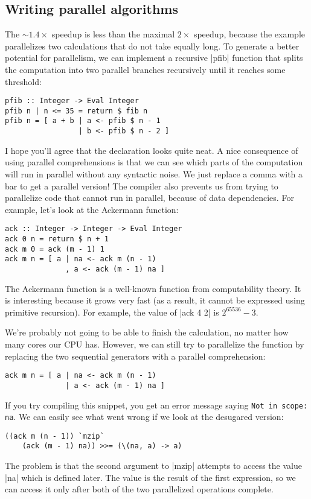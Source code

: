 \documentclass{tmr}
\begin{document}
\subsection{Writing parallel algorithms}
The $\mathord{\sim} 1.4\times$ speedup is less than the maximal $2\times$ speedup, because the example parallelizes two 
calculations that do not take equally long. To generate a better potential for parallelism,
we can implement a recursive |pfib| function that splits the computation into two parallel branches 
recursively until it reaches some threshold:

\begin{verbatim}
pfib :: Integer -> Eval Integer
pfib n | n <= 35 = return $ fib n
pfib n = [ a + b | a <- pfib $ n - 1 
                 | b <- pfib $ n - 2 ]
\end{verbatim}
I hope you'll agree that the declaration looks quite neat. A nice consequence of using parallel 
comprehensions is that we can see which parts of the computation will run in parallel without any 
syntactic noise. We just replace a comma with a bar to get a parallel version! The compiler also 
prevents us from trying to parallelize code that cannot run in parallel, because of data 
dependencies. For example, let's look at the Ackermann function: 

\begin{verbatim}
ack :: Integer -> Integer -> Eval Integer
ack 0 n = return $ n + 1
ack m 0 = ack (m - 1) 1
ack m n = [ a | na <- ack m (n - 1)
              , a <- ack (m - 1) na ]
\end{verbatim}
The Ackermann function is a well-known function from computability theory. It is interesting 
because it grows very fast (as a result, it cannot be expressed using primitive 
recursion). For example, the value of |ack 4 2| is $2^{65536} - 3$. 

We're probably not going to be able to finish the calculation, no matter how many cores our CPU 
has. However, we can still try to parallelize the function by replacing the two sequential 
generators with a parallel comprehension:

\begin{verbatim}
ack m n = [ a | na <- ack m (n - 1)
              | a <- ack (m - 1) na ]
\end{verbatim}
If you try compiling this snippet, you get an error message saying \texttt{Not in scope: na}. We can 
easily see what went wrong if we look at the desugared version:

\begin{verbatim}
((ack m (n - 1)) `mzip` 
    (ack (m - 1) na)) >>= (\(na, a) -> a)
\end{verbatim}
The problem is that the second argument to |mzip| attempts to access the value |na| which is 
defined later. The value is the result of the first expression, so we can access it only after 
both of the two parallelized operations complete. 
\end{document}
